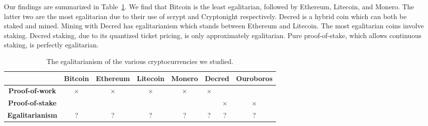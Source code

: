 
Our findings are summarized in Table~\ref{tbl:egalitarianism}. We find that
Bitcoin is the least egalitarian, followed by Ethereum, Litecoin, and Monero.
The latter two are the most egalitarian due to their use of scrypt and
Cryptonight respectively. Decred is a hybrid coin which can both be staked and
mined. Mining with Decred has egalitarianism which stands between Ethereum and
Litecoin. The most egalitarian coins involve staking. Decred staking, due to its
quantized ticket pricing, is only approximately egalitarian. Pure proof-of-stake, which
allows continuous staking, is perfectly egalitarian.


\begin{table}
  \centering
  \begin{tabular}{|c|c|c|c|c|c|c|c|}
    \hline
    & Bitcoin & Ethereum & Litecoin & Monero & \multicolumn{2}{c|}{Decred} & Ouroboros\\
    \hline
    \textbf{Proof-of-work} &
    $\times$ & $\times$ & $\times$ & $\times$ & $\times$ & & \\
    \hline
    \textbf{Proof-of-stake} &
    & & & & & $\times$ & $\times$ \\
    \hline
    \textbf{Egalitarianism} &
    ? & ? & ? & ? & ? & ? & ? \\
    \hline
  \end{tabular}
  \caption{The egalitarianism of the various cryptocurrencies we studied.}
  \label{tbl:egalitarianism}
\end{table}

